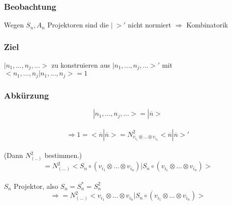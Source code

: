 \documentclass[twoside,a4paper]{scrartcl}
\renewcommand{\1}{\mathds{1}}
\newcommand{\Ra}{\Rightarrow}
\begin{document}
\subsubsection*{Beobachtung} 
Wegen $S_n,A_n$ Projektoren sind die $| \ >'$ nicht normiert $\Ra$ Kombinatorik
\subsubsection*{Ziel} 
$|n_1,...,n_j,...>$ zu konstruieren aus $|n_1,...,n_j,...>'$ mit $<n_1,...,n_j|n_1,...,n_j>=1$
\subsubsection*{Abkürzung} 
$$|n_1,...,n_j,...>=|\overline{n}>$$\\$$ \Ra 1=<\overline{n}|\overline{n}>=N^2_{v_{i_1}\otimes ... \otimes v_{i_n}}<\overline{n}|\overline{n}>'$$\\
(Dann $N^2_{(..)}$ bestimmen.)\\
$$=N^2_{(...)}<S_n \circ (v_{i_1}\otimes ... \otimes v_{i_n})|S_n \circ (v_{i_1}\otimes ... \otimes v_{i_n})>$$\\
$S_n$ Projektor, also $S_n=S_n^*=S_n^2$\\
$$\Ra = N^2_{(...)}<v_{i_1}\otimes ... \otimes v_{i_n}|S_n \circ (v_{i_1}\otimes ... \otimes v_{i_n})>$$
\end{document}
